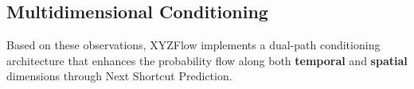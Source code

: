 \documentclass{article}
\theoremstyle{plain}
\theoremstyle{definition}
\theoremstyle{remark}
\begin{document}





\subsection{Multidimensional Conditioning}

Based on these observations, XYZFlow implements a dual-path conditioning architecture that enhances the probability flow along both \textbf{temporal} and \textbf{spatial} dimensions through Next Shortcut Prediction.

\vspace{-2mm}
\end{document}
